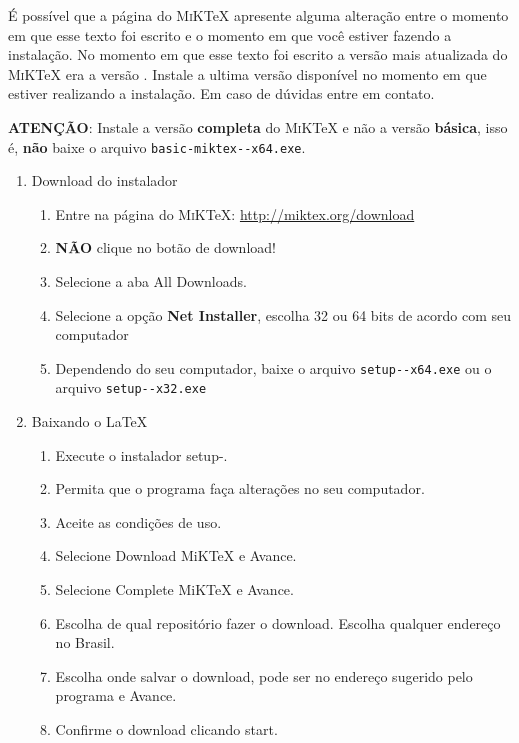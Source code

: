 \documentclass[fleqn]{profmat-cefet}
\newcommand{\MiKTeX}   {\textsc{MiK}\TeX}
\begin{document}
É possível que a página do \MiKTeX{} apresente alguma alteração entre o momento
em que esse texto foi escrito e o momento em que você estiver fazendo a
instalação. No momento em que esse texto foi escrito a versão mais atualizada do
\MiKTeX{} era a versão \miktexversion{}. Instale a ultima versão disponível no
momento em que estiver realizando a instalação.  Em caso de dúvidas entre em
contato.

{\color{red}\textbf{ATENÇÃO}}: Instale a versão \textbf{completa} do \MiKTeX{} e
não a versão \textbf{básica}, isso é, {\color{red}\textbf{não}} baixe o arquivo
\texttt{basic-miktex-\miktexversion-x64.exe}.

\begin{enumerate}
    \item Download do instalador
    \begin{enumerate}
        \item Entre na página do \MiKTeX{}: \url{http://miktex.org/download}
        \item {\color{red}\textbf{NÃO}} clique no botão de download!
        \item Selecione a aba \textsf{All Downloads}.
        \item Selecione a opção \textbf{Net Installer}, escolha 32 ou 64 bits de acordo com seu computador
        \item Dependendo do seu computador, baixe o arquivo \texttt{setup-\miktexversion-x64.exe}
                 ou o arquivo \texttt{setup-\miktexversion-x32.exe}
    \end{enumerate}
    \item Baixando o \LaTeX{}
    \begin{enumerate}
        \item Execute o instalador \textsf{setup-\miktexversion{}}.
        \item Permita que o programa faça alterações no seu computador.
        \item Aceite as condições de uso.
        \item Selecione \textsf{Download MiKTeX} e Avance.
        \item Selecione \textsf{Complete MiKTeX} e Avance.
        \item Escolha de qual repositório fazer o download. Escolha qualquer endereço no Brasil.
        \item Escolha onde salvar o download, pode ser no endereço sugerido pelo programa e Avance.
        \item Confirme o download clicando \textsf{start}.

\end{enumerate}
\end{enumerate}
\end{document}

